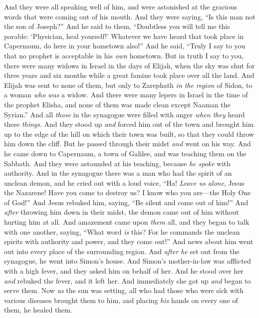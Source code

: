 \begin{biblechapter}
\verse And they were all speaking well of him, and were astonished at the gracious words that were coming out of his mouth. And they were saying, “Is this man not the son of Joseph?”
\verse And he said to them, “Doubtless you will tell me this parable: ‘Physician, heal yourself!’ Whatever we have heard that took place in Capernaum, do here in your hometown also!”
\verse And he said, “Truly I say to you that no prophet is acceptable in his \textit{own} hometown.
\verse But in truth I say to you, there were many widows in Israel in the days of Elijah, when the sky was shut for three years and six months while a great famine took place over all the land.
\verse And Elijah was sent to none of them, but only to Zarephath \textit{in the region} of Sidon, to a woman \textit{who was} a widow.
\verse And there were many lepers in Israel in the time of the prophet Elisha, and none of them was made clean except Naaman the Syrian.”
\verse And all \textit{those} in the synagogue were filled with anger \textit{when they} heard these \textit{things}.
\verse And they stood up \textit{and} forced him out of the town and brought him up to the edge of the hill on which their town was built, so that they could throw him down the cliff.
\verse But he passed through their midst \textit{and} went on his way.
 And he came down to Capernaum, a town of Galilee, and was teaching them on the Sabbath.
\verse And they were astounded at his teaching, because \textit{he spoke} with authority.
\verse And in the synagogue there was a man who had the spirit of an unclean demon, and he cried out with a loud voice,
\verse “Ha! \textit{Leave us alone}, Jesus the Nazarene! Have you come to destroy us? I know who you are—the Holy One of God!”
\verse And Jesus rebuked him, saying, “Be silent and come out of him!” And \textit{after} throwing him down in their midst, the demon came out of him without hurting him at all.
\verse And amazement came upon \textit{them} all, and they began to talk with one another, saying, “What word \textit{is} this? For he commands the unclean spirits with authority and power, and they come out!”
\verse And news about him went out into every place of the surrounding region.
\verse And \textit{after he} set out from the synagogue, he went into Simon’s house. And Simon’s mother-in-law was afflicted with a high fever, and they asked him on behalf of her.
\verse And he stood over her \textit{and} rebuked the fever, and it left her. And immediately she got up \textit{and} began to serve them.
\verse Now \textit{as} the sun was setting, all who had those who were sick with various diseases brought them to him, and placing \textit{his} hands on every one of them, he healed them.

\end{biblechapter}

